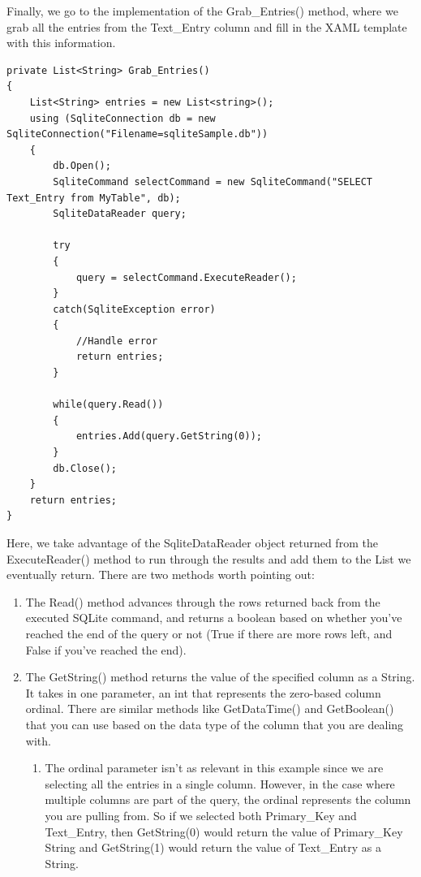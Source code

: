 Finally, we go to the implementation of the Grab\_Entries() method, where we grab all the entries from the Text\_Entry column and fill in the XAML template with this information.

\begin{lstlisting}[style=CSharpStyle]
private List<String> Grab_Entries()
{
	List<String> entries = new List<string>();
	using (SqliteConnection db = new SqliteConnection("Filename=sqliteSample.db"))
	{
		db.Open();
		SqliteCommand selectCommand = new SqliteCommand("SELECT Text_Entry from MyTable", db);
		SqliteDataReader query;
		
		try
		{
			query = selectCommand.ExecuteReader();
		}
		catch(SqliteException error)
		{
			//Handle error
			return entries;
		}
		
		while(query.Read())
		{
			entries.Add(query.GetString(0));
		}
		db.Close();
	}
	return entries;
}
\end{lstlisting}

Here, we take advantage of the SqliteDataReader object returned from the ExecuteReader() method to run through the results and add them to the List we eventually return. There are two methods worth pointing out:

\begin{enumerate}
	\item The Read() method advances through the rows returned back from the executed SQLite command, and returns a boolean based on whether you’ve reached the end of the query or not (True if there are more rows left, and False if you’ve reached the end).
	\item The GetString() method returns the value of the specified column as a String. It takes in one parameter, an int that represents the zero-based column ordinal. There are similar methods like GetDataTime() and GetBoolean() that you can use based on the data type of the column that you are dealing with. 
	\begin{enumerate}
		\item The ordinal parameter isn’t as relevant in this example since we are selecting all the entries in a single column. However, in the case where multiple columns are part of the query, the ordinal represents the column you are pulling from. So if we selected both Primary\_Key and Text\_Entry, then GetString(0) would return the value of Primary\_Key String and GetString(1) would return the value of Text\_Entry as a String.
	\end{enumerate}
\end{enumerate}

